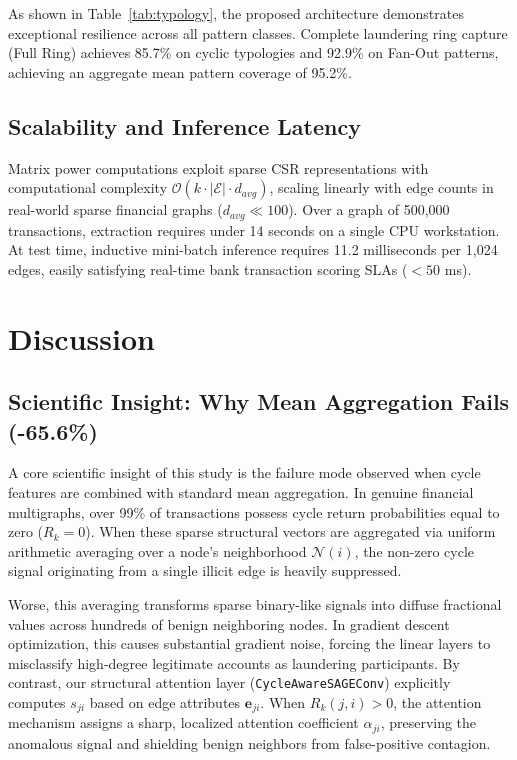 \documentclass[10pt,twocolumn]{article}
\begin{document}
As shown in Table~\ref{tab:typology}, the proposed architecture demonstrates exceptional resilience across all pattern classes. Complete laundering ring capture (Full Ring) achieves 85.7\% on cyclic typologies and 92.9\% on Fan-Out patterns, achieving an aggregate mean pattern coverage of 95.2\%.

\subsection{Scalability and Inference Latency}
Matrix power computations exploit sparse CSR representations with computational complexity $\mathcal{O}(k \cdot |\mathcal{E}| \cdot d_{avg})$, scaling linearly with edge counts in real-world sparse financial graphs ($d_{avg} \ll 100$). Over a graph of 500,000 transactions, extraction requires under 14 seconds on a single CPU workstation. At test time, inductive mini-batch inference requires 11.2 milliseconds per 1,024 edges, easily satisfying real-time bank transaction scoring SLAs ($< 50$ ms).

\section{Discussion}

\subsection{Scientific Insight: Why Mean Aggregation Fails (-65.6\%)}
A core scientific insight of this study is the failure mode observed when cycle features are combined with standard mean aggregation. In genuine financial multigraphs, over 99\% of transactions possess cycle return probabilities equal to zero ($R_k = 0$). When these sparse structural vectors are aggregated via uniform arithmetic averaging over a node's neighborhood $\mathcal{N}(i)$, the non-zero cycle signal originating from a single illicit edge is heavily suppressed. 

Worse, this averaging transforms sparse binary-like signals into diffuse fractional values across hundreds of benign neighboring nodes. In gradient descent optimization, this causes substantial gradient noise, forcing the linear layers to misclassify high-degree legitimate accounts as laundering participants. By contrast, our structural attention layer (\texttt{CycleAwareSAGEConv}) explicitly computes $s_{ji}$ based on edge attributes $\mathbf{e}_{ji}$. When $R_k(j, i) > 0$, the attention mechanism assigns a sharp, localized attention coefficient $\alpha_{ji}$, preserving the anomalous signal and shielding benign neighbors from false-positive contagion.
\end{document}
